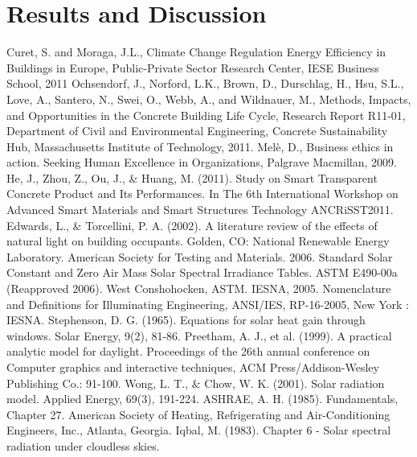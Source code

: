 \documentclass[times, 10pt,a4paper]{article}
\begin{document}
\section{Results and Discussion}
%
\begin{thebibliography}{4}
\footnotesize 
{} Curet, S. and Moraga, J.L., Climate Change Regulation Energy Efficiency in Buildings in Europe, 
Public-Private Sector Research Center, IESE Business School, 2011
 Ochsendorf, J., Norford, L.K., Brown, D., Durschlag, H., Hsu, S.L., Love, A., Santero, N., Swei, 
O., Webb, A., and Wildnauer, M., Methods, Impacts, and Opportunities in the Concrete Building Life Cycle, 
Research Report R11-01, Department of Civil and Environmental Engineering, Concrete Sustainability Hub, Massachusetts Institute of Technology, 2011.
 Mel\`{e}, D., Business ethics in action. Seeking Human Excellence in Organizations, Palgrave Macmillan, 2009.
 He, J., Zhou, Z., Ou, J., \& Huang, M. (2011). Study on Smart Transparent Concrete Product and Its Performances. 
In The 6th International Workshop on Advanced Smart Materials and Smart Structures Technology ANCRiSST2011.
 Edwards, L., \& Torcellini, P. A. (2002). A literature review of the effects of natural light on building occupants. 
Golden, CO: National Renewable Energy Laboratory. 
 American Society for Testing and Materials. 2006. Standard Solar Constant and 
Zero Air Mass Solar Spectral Irradiance Tables. ASTM E490-00a (Reapproved 2006). West 
Conshohocken, ASTM.
 IESNA, 2005. Nomenclature and Definitions for Illuminating Engineering, ANSI/IES,
RP-16-2005, New York : IESNA.
 Stephenson, D. G. (1965). Equations for solar heat gain through windows. Solar Energy, 9(2), 81-86.
 Preetham, A. J., et al. (1999). A practical analytic model for daylight. Proceedings of the 26th 
annual conference on Computer graphics and interactive techniques, ACM Press/Addison-Wesley Publishing Co.: 91-100.
Wong, L. T., \& Chow, W. K. (2001). Solar radiation model. Applied Energy, 69(3), 191-224.
 ASHRAE, A. H. (1985). Fundamentals, Chapter 27. American Society of Heating, Refrigerating and Air-Conditioning Engineers, Inc., Atlanta, Georgia.
 Iqbal, M. (1983). Chapter 6 - Solar spectral radiation under cloudless skies. 

\end{thebibliography}
\end{document}
